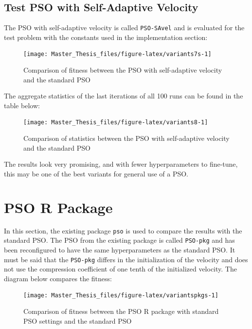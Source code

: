 \documentclass[
  oneside, a4paper, 12pt, openany]{book}
\theoremstyle{definition}
\theoremstyle{definition}
\theoremstyle{definition}
\theoremstyle{definition}
\theoremstyle{remark}
\begin{document}
\hypertarget{test-pso-with-self-adaptive-velocity}{%
\subsection{Test PSO with Self-Adaptive Velocity}\label{test-pso-with-self-adaptive-velocity}}

The PSO with self-adaptive velocity is called \texttt{PSO-SAvel} and is evaluated for the test problem with the constants used in the implementation section:

\begin{figure}[H]
\texttt{[image: Master\_Thesis\_files/figure-latex/variants7s-1]} \caption{Comparison of fitness between the PSO with self-adaptive velocity and the standard PSO}\label{fig:variants7s}
\end{figure}

The aggregate statistics of the last iterations of all 100 runs can be found in the table below:

\begin{figure}[H]
\texttt{[image: Master\_Thesis\_files/figure-latex/variants8-1]} \caption{Comparison of statistics between the PSO with self-adaptive velocity and the standard PSO}\label{fig:variants8}
\end{figure}

\vspace{-0.1cm}

The results look very promising, and with fewer hyperparameters to fine-tune, this may be one of the best variants for general use of a PSO.

\hypertarget{pso-r-package}{%
\section{PSO R Package}\label{pso-r-package}}

In this section, the existing package \texttt{pso} is used to compare the results with the standard PSO. The PSO from the existing package is called \texttt{PSO-pkg} and has been reconfigured to have the same hyperparameters as the standard PSO. It must be said that the \texttt{PSO-pkg} differs in the initialization of the velocity and does not use the compression coefficient of one tenth of the initialized velocity. The diagram below compares the fitness:

\vspace{-0.1cm}

\begin{figure}[H]
\texttt{[image: Master\_Thesis\_files/figure-latex/variantspkgs-1]} \caption{Comparison of fitness between the PSO R package with standard PSO settings and the standard PSO}\label{fig:variantspkgs}
\end{figure}
\end{document}
